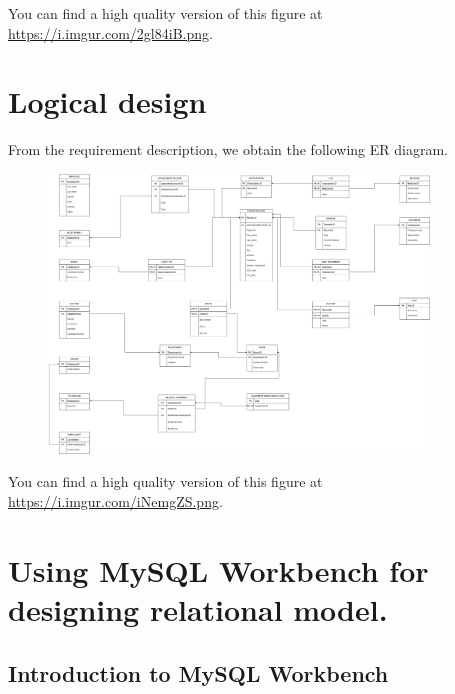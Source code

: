 \documentclass[a4paper]{article}
\numberwithin{equation}{section}
\begin{document}
You can find a high quality version of this figure at \url{https://i.imgur.com/2gl84iB.png}.

\newpage

\section{Logical design}
From the requirement description, we obtain the following ER diagram.

\begin{figure}[H]
  \centering
  \includegraphics[width=0.9\textwidth]{./assets/logical design.png}\label{Logical design}
\end{figure}

You can find a high quality version of this figure at \url{https://i.imgur.com/iNemgZS.png}.

\newpage



\section{Using MySQL Workbench for designing relational model.}
\subsection{Introduction to MySQL Workbench}

\end{document}
